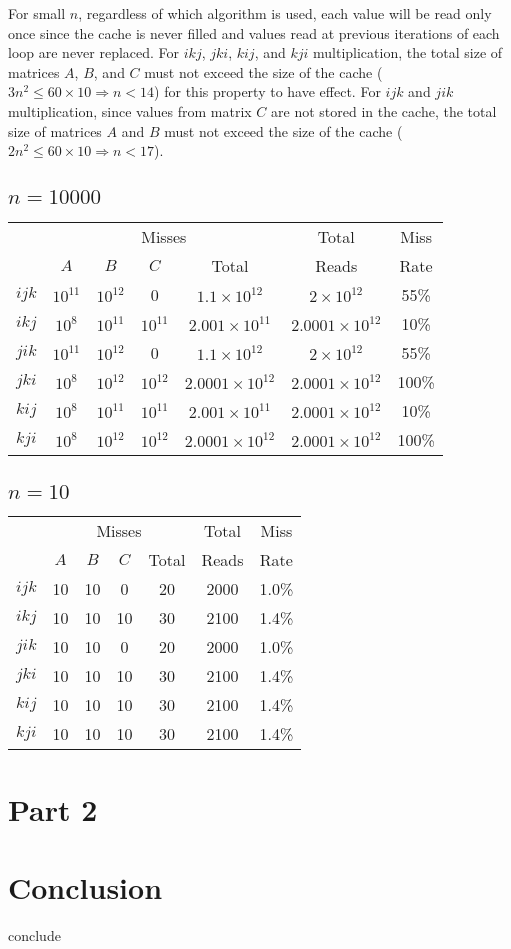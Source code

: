 \documentclass[12pt,letterpaper,oneside]{article}
\begin{document}
For small $n$, regardless of which algorithm is used, each value will be read only once since the cache is never filled and values read at previous iterations of each loop are never replaced.
For $ikj$, $jki$, $kij$, and $kji$ multiplication, the total size of matrices $A$, $B$, and $C$ must not exceed the size of the cache ($3n^2\le60\times10\Rightarrow n<14$) for this property to have effect.
For $ijk$ and $jik$ multiplication, since values from matrix $C$ are not stored in the cache, the total size of matrices $A$ and $B$ must not exceed the size of the cache ($2n^2\le60\times10\Rightarrow n<17$).

\begin{center}
	\subsection*{$n=10000$}
	\begin{tabular}{c | c c c c | c c}
		& \multicolumn{4}{c|}{Misses} & Total & Miss \\
		& $A$ & $B$ & $C$ & Total & Reads & Rate \\
		\hline
		$ijk$ & $10^{11}$ & $10^{12}$ & 0 & $1.1\times10^{12}$ & $2\times10^{12}$ & 55\% \\
		$ikj$ & $10^8$ & $10^{11}$ & $10^{11}$ & $2.001\times10^{11}$ & $2.0001\times10^{12}$ & 10\% \\
		$jik$ & $10^{11}$ & $10^{12}$ & 0 & $1.1\times10^{12}$ & $2\times10^{12}$ & 55\% \\
		$jki$ & $10^8$ & $10^{12}$ & $10^{12}$ & $2.0001\times10^{12}$ & $2.0001\times10^{12}$ & 100\% \\
		$kij$ & $10^8$ & $10^{11}$ & $10^{11}$ & $2.001\times10^{11}$ & $2.0001\times10^{12}$ & 10\% \\
		$kji$ & $10^8$ & $10^{12}$ & $10^{12}$ & $2.0001\times10^{12}$ & $2.0001\times10^{12}$ & 100\% 
	\end{tabular}
	\subsection*{$n=10$}
	\begin{tabular}{c | c c c c | c c}
		& \multicolumn{4}{c|}{Misses} & Total & Miss \\
		& $A$ & $B$ & $C$ & Total & Reads & Rate \\
		\hline
		$ijk$ & 10 & 10 & 0 & 20 & 2000 & 1.0\% \\
		$ikj$ & 10 & 10 & 10 & 30 & 2100 & 1.4\% \\
		$jik$ & 10 & 10 & 0 & 20 & 2000 & 1.0\% \\
		$jki$ & 10 & 10 & 10 & 30 & 2100 & 1.4\% \\
		$kij$ & 10 & 10 & 10 & 30 & 2100 & 1.4\% \\
		$kji$ & 10 & 10 & 10 & 30 & 2100 & 1.4\% \\
	\end{tabular}
\end{center}

\section*{Part 2}


\section*{Conclusion}
conclude
 
\end{document}
